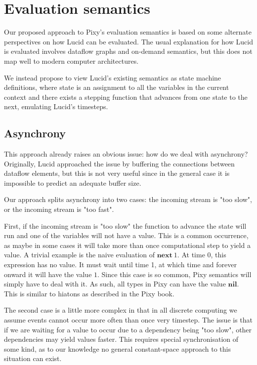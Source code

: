 \documentclass{scrartcl}
\begin{document}
    \section{Evaluation semantics}
    
    Our proposed approach to Pixy's evaluation semantics is based on some alternate perspectives on how Lucid can be evaluated. The usual explanation for how Lucid is evaluated involves dataflow graphs and on-demand semantics, but this does not map well to modern computer architectures.
    
    We instead propose to view Lucid's existing semantics as state machine definitions, where state is an assignment to all the variables in the current context and there exists a stepping function that advances from one state to the next, emulating Lucid's timesteps.
    
    \subsection{Asynchrony}
    
    This approach already raises an obvious issue: how do we deal with asynchrony? Originally, Lucid approached the issue by buffering the connections between dataflow elements, but this is not very useful since in the general case it is impossible to predict an adequate buffer size.
    
    Our approach splits asynchrony into two cases: the incoming stream is "too slow", or the incoming stream is "too fast".
    
    First, if the incoming stream is "too slow" the function to advance the state will run and one of the variables will not have a value. This is a common occurrence, as maybe in some cases it will take more than once computational step to yield a value. A trivial example is the naive evaluation of $\textbf{next}\ 1$. At time 0, this expression has no value. It must wait until time 1, at which time and forever onward it will have the value $1$. Since this case is so common, Pixy semantics will simply have to deal with it. As such, all types in Pixy can have the value $\textbf{nil}$. This is similar to hiatons as described in the Pixy book.
    
    The second case is a little more complex in that in all discrete computing we assume events cannot occur more often than once very timestep. The issue is that if we are waiting for a value to occur due to a dependency being "too slow", other dependencies may yield values faster. This requires special synchronisation of some kind, as to our knowledge no general constant-space approach to this situation can exist.
    
\end{document}
